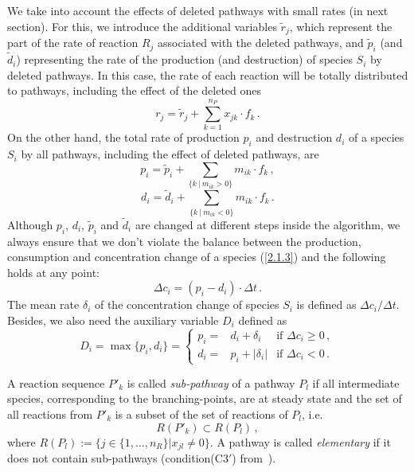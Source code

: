 We take into account the effects of deleted pathways with small rates (in next section). For this, we introduce the additional variables $\tilde{r}_j$, which represent the part of the rate of reaction $R_j$ associated with the deleted pathways, and $\tilde{p}_i$ (and $\tilde{d}_i$) representing the rate of the production (and destruction) of species $S_i$ by deleted pathways. In this case, the rate of each reaction will be totally distributed to pathways, including the effect of the deleted ones
\begin{equation}
r_j = \tilde{r}_j + \sum_{k = 1}^{n_P} x_{jk}\cdot f_k\,.
\label{2.2.2}
\end{equation}
On the other hand, the total rate of production $p_i$ and destruction $d_i$ of a species $S_i$ by all pathways, including the effect of deleted pathways, are
\begin{equation}
p_i = \tilde{p}_i + \sum_{\{k\ |\ m_{ik}>0\}} m_{ik}\cdot f_k\,,
\label{2.2.3}
\end{equation}
\begin{equation}
d_i = \tilde{d}_i + \sum_{\{k\ |\ m_{ik}<0\}} m_{ik}\cdot f_k\,.
\label{2.2.4}
\end{equation}
Although $p_i$, $d_i$, $\tilde{p}_i$ and $\tilde{d}_i$ are changed at different steps inside the algorithm, we always ensure that we don't violate the balance between the production, consumption and concentration change of a species (\ref{2.1.3}) and the following holds at any point:
\begin{equation}
\Delta c_i =  (p_i - d_i)\cdot\Delta t\,.
\label{2.2.5}
\end{equation}
The mean rate $\delta_i$ of the concentration change of species $S_i$ is defined as $\Delta c_i/  \Delta t$. Besides, we also need the auxiliary variable $D_i$ defined as
\begin{equation}
D_i = \max\{p_i,d_i\}= \left\{\begin{array}{ccc}p_i =  & d_i + \delta_i & \textrm{if }\Delta c_i \geqslant 0\,, \\d_i =  & p_i + |\delta_i| & \textrm{if }\Delta c_i < 0\,. \end{array}\right.
\label{2.2.6}
\end{equation}

A reaction sequence $P' _k$ is called \textit{sub-pathway} of a pathway $P_l$ if all intermediate species, corresponding to the branching-points, are at steady state and the set of all reactions from $P' _k$ is a subset of the set of reactions of $P_l$, i.e.
\begin{equation}
R(P'_k)\subset R(P_l)\,, 
\label{2.2.7}
\end{equation}
where $R(P_l) := \{j\in \{1,\ldots,n_R\}|x_{jl}\neq 0\}$. A pathway is called \textit{elementary} if it does not contain sub-pathways (condition(C3$'$) from~\cite{Sch2002}).


